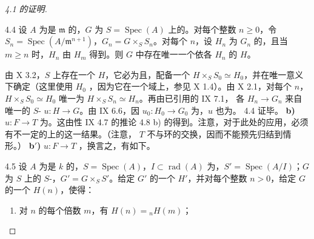 \begin{proof}[ 4.1 的证明]
\begin{SGAresult}{}{4.4}
设 $A$ 为是 $\mathfrak m$ 的，$G$ 为 $S=\operatorname{Spec}(A)$ 上的。对每个整数 $n\ge0$，令 $S_n=\operatorname{Spec}(A/\mathfrak m^{n+1})$，$G_n=G\times_S S_n$。对每个 $n$，设 $H_n$ 为 $G_n$ 的，且当 $m\ge n$ 时，$H_n$ 由 $H_m$ 得到。则 $G$ 中存在唯一一个依各 $H_n$ 的 $H$。
\end{SGAresult}
由 X 3.2，$S$ 上存在一个 $H$，它必为且，配备一个 $H\times_S S_0\simeq H_0$，并在唯一意义下确定（这里使用 $H_0$ ，因为它在一个域上，参见 X 1.4）。由 X 2.1，对每个 $n$， $H\times_S S_0\simeq H_0$ 唯一为 $H\times_S S_n\simeq H_n$。再由已引用的 IX 7.1，
各 $H_n\to G_n$ 来自唯一的 $S$- $u:H\to G$。由 IX 6.6，因 $u_0:H_0\to G_0$ 为，$u$ 也为。 4.4 证毕。
\textbf{b)}  $u:F\to T$ 为。这由性 IX 4.7 的推论 4.8 b) 的得到。注意，对于此处的应用，必须有不一定的上的这一结果。（注意， $T$ 不与环的交换，因而不能预先归结到情形。）
\textbf{b$'$)}  $u:F\to T$ ，换言之，有如下。
\begin{SGAresult}{}{4.5}
设 $A$ 为是 $k$ 的，$S=\operatorname{Spec}(A)$，$I\subset\operatorname{rad}(A)$ 为，$S'=\operatorname{Spec}(A/I)$；$G$ 为 $S$ 上的 $S$-，$G'=G\times_S S'$。给定 $G'$ 的一个 $H'$，并对每个整数 $n>0$，给定 $G$ 的一个 $H(n)$，使得：
\begin{enumerate}
\item[$1^\circ$)] 对 $n$ 的每个倍数 $m$，有 $H(n)={}_nH(m)$；

\end{enumerate}
\end{SGAresult}
\end{proof}

